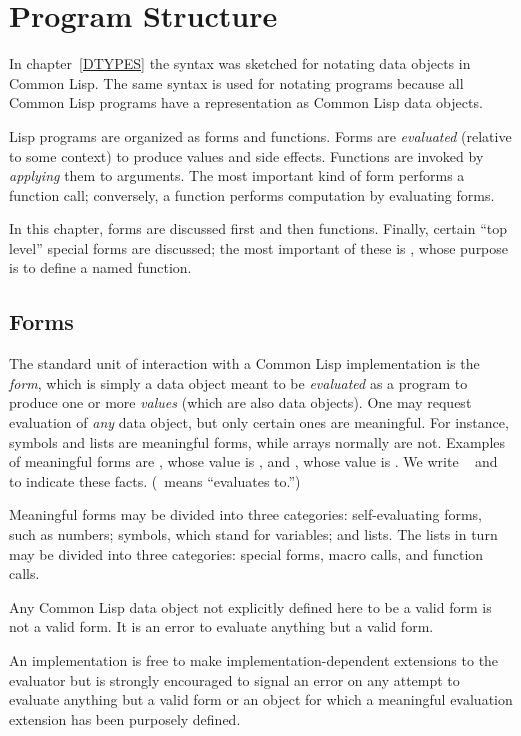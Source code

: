 
\clearpage\def\pagestatus{FINAL PROOF}


\chapter{Program Structure}
\label{PROGS}

In chapter~\ref{DTYPES} the syntax was sketched for notating data objects
in Common Lisp.  The same syntax is used for notating programs because all
Common Lisp programs have a representation as Common Lisp data objects.

Lisp programs are organized as forms and functions.  Forms are
{\it evaluated} (relative to some context) to produce values and side
effects.  Functions are invoked by {\it applying} them to arguments.
The most important kind of form performs a function call;
conversely, a function performs computation by evaluating forms.

In this chapter, forms are discussed first and then functions.
Finally, certain ``top level'' special forms are discussed; the most
important of these is , whose purpose is to define a
named function.

\section{Forms}

The standard unit of interaction with a Common Lisp implementation is the {\it form},
which is simply a data object meant to be {\it evaluated} as a program
to produce one or more {\it values} (which are also data objects).
One may request evaluation of {\it any} data object, but only certain ones
are meaningful.  For instance,
symbols and lists are meaningful forms, while arrays
normally are not.  Examples of meaningful forms are ,
whose value is , and , whose value is .
We write  \EV\  and  \EV\ 
to indicate these facts.  (\EV\ means ``evaluates to.'')

Meaningful forms may be divided into three categories:
self-evaluating forms, such as numbers; symbols, which stand
for variables; and lists.  The lists in turn may be divided
into three categories: special forms, macro calls, and function calls.

\begin{obsolete}
Any Common Lisp data object not explicitly defined here to be a valid form
is not a valid form.  It is an error to evaluate
anything but a valid form.

\beforenoterule
\begin{implementation}
An implementation is free to make
implementation-dependent extensions to the evaluator but is
strongly encouraged to signal an error on any attempt to
evaluate anything but a valid form or an object for which
a meaningful evaluation extension has been purposely defined.
\end{implementation}
\afternoterule
\end{obsolete}

